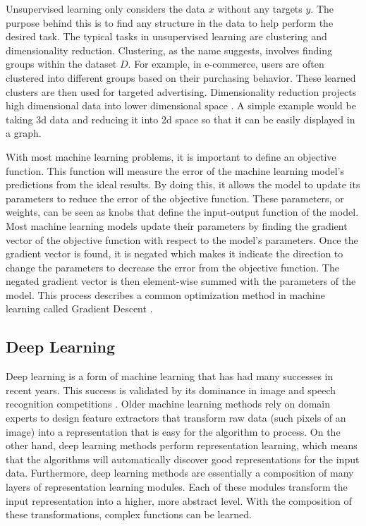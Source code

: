 Unsupervised learning only considers the data $x$ without any targets $y$. The purpose behind this is to find any structure in the data to help perform the desired task. The typical tasks in unsupervised learning are clustering and dimensionality reduction. Clustering, as the name suggests, involves finding groups within the dataset $D$. For example, in e-commerce, users are often clustered into different groups based on their purchasing behavior. These learned clusters are then used for targeted advertising. Dimensionality reduction projects high dimensional data into lower dimensional space \cite{Murphy}. A simple example would be taking 3d data and reducing it into 2d space so that it can be easily displayed in a graph.

With most machine learning problems, it is important to define an objective function. This function will measure the error of the machine learning model's predictions from the ideal results. By doing this, it allows the model to update its parameters to reduce the error of the objective function. These parameters, or weights, can be seen as knobs that define the input-output function of the model. Most machine learning models update their parameters by finding the gradient vector of the objective function with respect to the model's parameters. Once the gradient vector is found, it is negated which makes it indicate the direction to change the parameters to decrease the error from the objective function. The negated gradient vector is then element-wise summed with the parameters of the model. This process describes a common optimization method in machine learning called Gradient Descent \cite{Nature_DL}. 

\subsection{Deep Learning}

Deep learning is a form of machine learning that has had many successes in recent years. This success is validated by its dominance in image and speech recognition competitions \cite{Nature_DL}. Older machine learning methods rely on domain experts to design feature extractors that transform raw data (such pixels of an image) into a representation that is easy for the algorithm to process. On the other hand, deep learning methods perform representation learning, which means that the algorithms will automatically discover good representations for the input data. Furthermore, deep learning methods are essentially a composition of many layers of representation learning modules. Each of these modules transform the input representation into a higher, more abstract level. With the composition of these transformations, complex functions can be learned.

